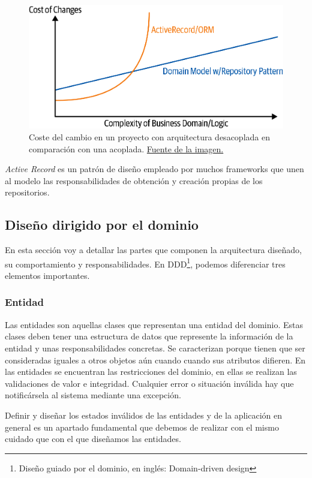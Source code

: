 \FloatBarrier
\begin{figure}[h]
	\centering	
	\includegraphics[width=\textwidth]{doc/logos/imgs/costeEvolucion.png}
    \caption{\cite{py-repo-pattern} Coste del cambio en un proyecto con arquitectura desacoplada en comparación con una acoplada. \href{https://www.cosmicpython.com/book/images/apwp_0205.png}{Fuente de la imagen.}}
    \label{fig:coste-repo-pattern}
\end{figure}
\FloatBarrier
\textit{Active Record} es un 
patrón de diseño empleado por muchos frameworks que unen al modelo las responsabilidades de 
obtención y creación propias de los repositorios.

\subsection{Diseño dirigido por el dominio}
En esta sección voy a detallar las partes que componen la arquitectura diseñado, su
comportamiento y responsabilidades. En DDD\footnote{Diseño guiado por el dominio, en
inglés: Domain-driven design}, podemos diferenciar tres elementos importantes.

\subsubsection{Entidad}
Las entidades son aquellas clases que representan una entidad del dominio. Estas clases
deben tener una estructura de datos que represente la información de la entidad y unas
responsabilidades concretas. Se caracterizan porque tienen que ser consideradas iguales a
otros objetos aún cuando cuando sus atributos difieren. En las entidades se encuentran las
restricciones del dominio, en ellas se realizan las validaciones de valor e integridad.
Cualquier error o situación inválida hay que notificársela al sistema mediante una
excepción. 

Definir y diseñar los estados inválidos de las entidades y de la aplicación en general es
un apartado fundamental que debemos de realizar con el mismo cuidado que con el que
diseñamos las entidades.

